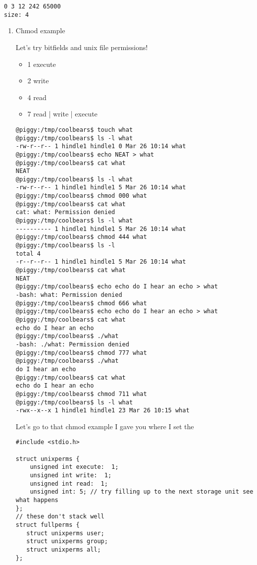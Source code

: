 \documentclass[11pt]{article}
\begin{document}
\begin{verbatim}
0 3 12 242 65000
size: 4
\end{verbatim}

\begin{enumerate}
\item Chmod example
\label{sec:orgbe5e2d7}

Let's try bitfields and unix file permissions!

\begin{itemize}
\item 1 execute
\item 2 write
\item 4 read

\item 7 read | write | execute
\end{itemize}

\begin{verbatim}
@piggy:/tmp/coolbears$ touch what
@piggy:/tmp/coolbears$ ls -l what
-rw-r--r-- 1 hindle1 hindle1 0 Mar 26 10:14 what
@piggy:/tmp/coolbears$ echo NEAT > what
@piggy:/tmp/coolbears$ cat what
NEAT
@piggy:/tmp/coolbears$ ls -l what
-rw-r--r-- 1 hindle1 hindle1 5 Mar 26 10:14 what
@piggy:/tmp/coolbears$ chmod 000 what
@piggy:/tmp/coolbears$ cat what
cat: what: Permission denied
@piggy:/tmp/coolbears$ ls -l what
---------- 1 hindle1 hindle1 5 Mar 26 10:14 what
@piggy:/tmp/coolbears$ chmod 444 what
@piggy:/tmp/coolbears$ ls -l
total 4
-r--r--r-- 1 hindle1 hindle1 5 Mar 26 10:14 what
@piggy:/tmp/coolbears$ cat what
NEAT
@piggy:/tmp/coolbears$ echo echo do I hear an echo > what
-bash: what: Permission denied
@piggy:/tmp/coolbears$ chmod 666 what
@piggy:/tmp/coolbears$ echo echo do I hear an echo > what
@piggy:/tmp/coolbears$ cat what
echo do I hear an echo
@piggy:/tmp/coolbears$ ./what
-bash: ./what: Permission denied
@piggy:/tmp/coolbears$ chmod 777 what
@piggy:/tmp/coolbears$ ./what
do I hear an echo
@piggy:/tmp/coolbears$ cat what
echo do I hear an echo
@piggy:/tmp/coolbears$ chmod 711 what
@piggy:/tmp/coolbears$ ls -l what
-rwx--x--x 1 hindle1 hindle1 23 Mar 26 10:15 what
\end{verbatim}

Let's go to that chmod example I gave you where I set the 

\begin{verbatim}
#include <stdio.h>

struct unixperms {
    unsigned int execute:  1;
    unsigned int write:  1;
    unsigned int read:  1;
    unsigned int: 5; // try filling up to the next storage unit see what happens
};
// these don't stack well
struct fullperms {
   struct unixperms user;
   struct unixperms group;
   struct unixperms all;
};


\end{verbatim}
\end{enumerate}
\end{document}

